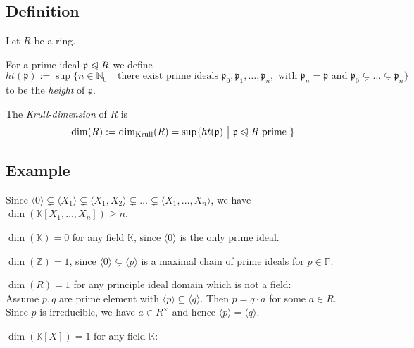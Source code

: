 \documentclass[12pt]{book}
\begin{document}
\begin{spacing}{1.3}
\subsection{Definition} %
Let $R$ be a ring.
\begin{compactenum}
\item For a prime ideal $\mathfrak{p} \trianglelefteqslant R$ we define
$$ht(\mathfrak{p}):=\sup\{n \in \mathbb{N}_0 \ \big \vert\ \textrm{ there exist prime ideals } \mathfrak{p}_0, \mathfrak{p}_1, \ldots, \mathfrak{p}_n, \textrm{ with } \mathfrak{p}_n=\mathfrak{p} \textrm{ and } \mathfrak{p}_0 \subsetneq \ldots \subsetneq \mathfrak{p}_n\}$$
to be the \textit{height} of $\mathfrak{p}$.
\item The \textit{Krull-dimension} of $R$ is
$$\dim(R):=\dim_{\textrm{Krull}}(R)= \sup\{ht(\mathfrak{p}) \ \big \vert\ \mathfrak{p} \trianglelefteqslant R \textrm{ prime }\}$$
\end{compactenum}

\subsection*{Example} %
\titleformat{\subsection}{\normalfont\normalsize\bfseries}{}{0em}{#1 \thesubsection}
\begin{compactenum}
\item Since $\langle 0 \rangle \subsetneq \langle X_1 \rangle \subsetneq \langle X_1, X_2 \rangle \subsetneq \ldots \subsetneq \langle X_1, \ldots, X_n \rangle$, we have $\dim\left(\mathbb{K}[X_1, \ldots, X_n]\right) \geqslant n$.\item $\dim(\mathbb{K})=0$ for any field $\mathbb{K}$, since $\langle 0 \rangle$ is the only prime ideal.
\item $\dim(\mathbb{Z})=1$, since $\langle 0 \rangle \subsetneq \langle p \rangle$ is a maximal chain of prime ideals for $p \in \mathbb{P}$.
\item $\dim(R) =1$ for any principle ideal domain which is not a field:\\
Assume $p,q$ are prime element with $\langle p \rangle \subseteq \langle q \rangle$. Then $p=q \cdot a$ for some $a \in R$. Since $p$ is irreducible, we have $a \in R^{\times}$ and hence $\langle p \rangle = \langle q \rangle$.
\item $\dim(\mathbb{K}[X])=1$ for any field $\mathbb{K}$: 
\end{compactenum}


\end{spacing}
\end{document}
